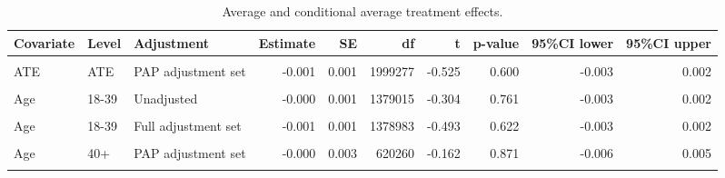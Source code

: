 \begin{table}
\centering
\caption{Average and conditional average treatment effects.}
\centering
\fontsize{8}{10}\selectfont
\begin{tabular}[t]{lllrrrrrrr}
\toprule
Covariate & Level & Adjustment & Estimate & SE & df & t & p-value & 95\%CI lower & 95\%CI upper\\
\midrule
\cellcolor{gray!10}{ATE} & \cellcolor{gray!10}{ATE} & \cellcolor{gray!10}{Unadjusted} & \cellcolor{gray!10}{-0.000} & \cellcolor{gray!10}{0.001} & \cellcolor{gray!10}{1999280} & \cellcolor{gray!10}{-0.200} & \cellcolor{gray!10}{0.842} & \cellcolor{gray!10}{-0.003} & \cellcolor{gray!10}{0.002}\\
ATE & ATE & PAP adjustment set & -0.001 & 0.001 & 1999277 & -0.525 & 0.600 & -0.003 & 0.002\\
\cellcolor{gray!10}{ATE} & \cellcolor{gray!10}{ATE} & \cellcolor{gray!10}{Full adjustment set} & \cellcolor{gray!10}{-0.001} & \cellcolor{gray!10}{0.001} & \cellcolor{gray!10}{1999248} & \cellcolor{gray!10}{-0.436} & \cellcolor{gray!10}{0.663} & \cellcolor{gray!10}{-0.003} & \cellcolor{gray!10}{0.002}\\
Age & 18-39 & Unadjusted & -0.000 & 0.001 & 1379015 & -0.304 & 0.761 & -0.003 & 0.002\\
\cellcolor{gray!10}{Age} & \cellcolor{gray!10}{18-39} & \cellcolor{gray!10}{PAP adjustment set} & \cellcolor{gray!10}{-0.001} & \cellcolor{gray!10}{0.001} & \cellcolor{gray!10}{1379012} & \cellcolor{gray!10}{-0.682} & \cellcolor{gray!10}{0.495} & \cellcolor{gray!10}{-0.003} & \cellcolor{gray!10}{0.002}\\
Age & 18-39 & Full adjustment set & -0.001 & 0.001 & 1378983 & -0.493 & 0.622 & -0.003 & 0.002\\
\cellcolor{gray!10}{Age} & \cellcolor{gray!10}{40+} & \cellcolor{gray!10}{Unadjusted} & \cellcolor{gray!10}{0.000} & \cellcolor{gray!10}{0.003} & \cellcolor{gray!10}{620263} & \cellcolor{gray!10}{0.150} & \cellcolor{gray!10}{0.881} & \cellcolor{gray!10}{-0.006} & \cellcolor{gray!10}{0.007}\\
Age & 40+ & PAP adjustment set & -0.000 & 0.003 & 620260 & -0.162 & 0.871 & -0.006 & 0.005\\
\cellcolor{gray!10}{Age} & \cellcolor{gray!10}{40+} & \cellcolor{gray!10}{Full adjustment set} & \cellcolor{gray!10}{-0.000} & \cellcolor{gray!10}{0.003} & \cellcolor{gray!10}{620243} & \cellcolor{gray!10}{-0.059} & \cellcolor{gray!10}{0.953} & \cellcolor{gray!10}{-0.006} & \cellcolor{gray!10}{0.005}\\

\end{tabular}
\end{table}
